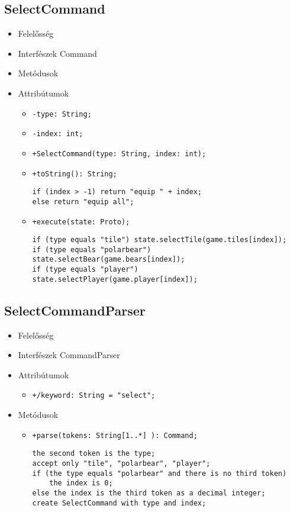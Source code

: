 \subsection{SelectCommand}
\begin{itemize}
\item Felelősség\newline
\item Interfészek\newline
Command
\item Metódusok
\item Attribútumok
	\begin{itemize}
		\item \texttt{-type: String;}
		\item \texttt{-index: int;}
	\end{itemize}
\begin{itemize}
		\item \texttt{+SelectCommand(type: String, index: int);}
		\item \texttt{+toString(): String;}
		\begin{lstlisting}
if (index > -1) return "equip " + index;
else return "equip all";
		\end{lstlisting}
		\item \texttt{+execute(state: Proto);}
		\begin{lstlisting}
if (type equals "tile") state.selectTile(game.tiles[index]);
if (type equals "polarbear") state.selectBear(game.bears[index]);
if (type equals "player") state.selectPlayer(game.player[index]);
		\end{lstlisting}
	\end{itemize}
\end{itemize}
\subsection{SelectCommandParser}
\begin{itemize}
\item Felelősség\newline
\item Interfészek\newline
CommandParser
\item Attribútumok
	\begin{itemize}
		\item \texttt{+/keyword: String = "select";}
	\end{itemize}
\item Metódusok
\begin{itemize}
		\item \texttt{+parse(tokens: String[1..*] ): Command;}
		\begin{lstlisting}
the second token is the type;
accept only "tile", "polarbear", "player";
if (the type equals "polarbear" and there is no third token)
	the index is 0;
else the index is the third token as a decimal integer;
create SelectCommand with type and index;
		\end{lstlisting}
	\end{itemize}
\end{itemize}

